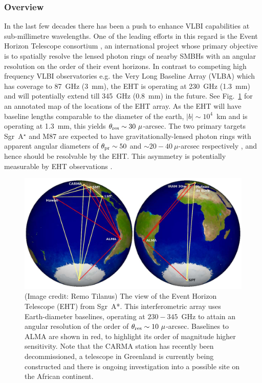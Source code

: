 {\subsubsection{Overview}
In the last few decades there has been a push to enhance VLBI capabilities at sub-millimetre wavelengths. One of the leading efforts in this regard is the Event Horizon Telescope consortium \citep[(EHT),][]{Doeleman_2010}, an international project whose primary objective is to spatially resolve the lensed photon rings of nearby SMBHs with an angular resolution on the order of their event horizons. In contrast to competing high frequency VLBI observatories e.g. the Very Long Baseline Array (VLBA) which has coverage to 87~GHz (3~mm), the EHT is operating at 230~GHz (1.3~mm) and will potentially extend till 345~GHz (0.8~mm) in the future. See Fig.~\ref{fig:eht_globe} for an annotated map of the locations of the EHT array. As the EHT will have baseline lengths comparable to the diameter of the earth, $|b| \sim 10^4$~km and is operating at 1.3~mm, this yields $\theta_{\rm res} \sim 30\ \mu$-arcsec.  The two primary targets Sgr~A$^\star$ and M87 are expected to have gravitationally-lensed photon rings with apparent angular diameters of $\theta_{\rm pr} \sim 50$ and $\sim 20-40\ \mu$-arcsec respectively \citep*{Broderick_2009,Falcke_2013}, and hence should be resolvable by the EHT. 
 This asymmetry is potentially measurable by EHT observations \citep{Broderick_2014}.
\begin{figure}[h!]
\includegraphics[width=0.8\columnwidth]{Images/eht_globe}
\caption{(Image credit: Remo Tilanus) The view of the Event Horizon Telescope (EHT) from Sgr~A*. This interferometric array uses Earth-diameter baselines, operating at $230-345$~GHz to attain an angular resolution of the order of ${\theta_{\rm res} \sim 10\ \mu}$-arcsec. Baselines to ALMA are shown in red, to highlight its order of magnitude higher sensitivity. Note that the CARMA station has recently been decommissioned, a telescope in Greenland is currently being constructed and there is ongoing investigation into a possible site on the African continent.\label{fig:eht_globe}%
}
\end{figure}



}
